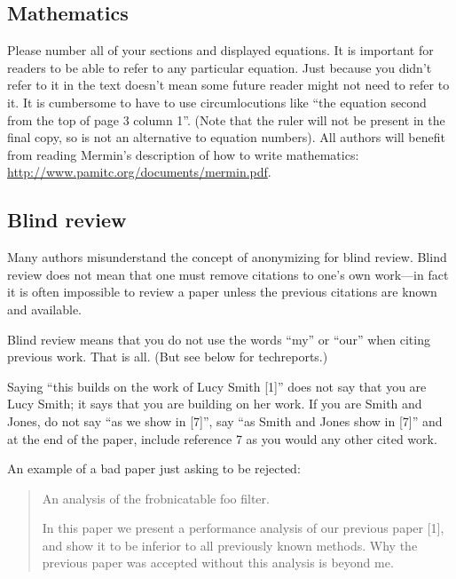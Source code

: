 \documentclass[10pt,twocolumn,letterpaper]{article}
\begin{document}
\begin{CJK}{UTF8}{bkai}
   \subsection{Mathematics}

   Please number all of your sections and displayed equations.  It is
   important for readers to be able to refer to any particular equation.  Just
   because you didn't refer to it in the text doesn't mean some future reader
   might not need to refer to it.  It is cumbersome to have to use
   circumlocutions like ``the equation second from the top of page 3 column
   1''.  (Note that the ruler will not be present in the final copy, so is not
   an alternative to equation numbers).  All authors will benefit from reading
   Mermin's description of how to write mathematics:
   \url{http://www.pamitc.org/documents/mermin.pdf}.


   \subsection{Blind review}

   Many authors misunderstand the concept of anonymizing for blind
   review.  Blind review does not mean that one must remove
   citations to one's own work---in fact it is often impossible to
   review a paper unless the previous citations are known and
   available.

   Blind review means that you do not use the words ``my'' or ``our''
   when citing previous work.  That is all.  (But see below for
   techreports.)

   Saying ``this builds on the work of Lucy Smith [1]'' does not say
   that you are Lucy Smith; it says that you are building on her
   work.  If you are Smith and Jones, do not say ``as we show in
      [7]'', say ``as Smith and Jones show in [7]'' and at the end of the
   paper, include reference 7 as you would any other cited work.

   An example of a bad paper just asking to be rejected:
   \begin{quote}
      \begin{center}
         An analysis of the frobnicatable foo filter.
      \end{center}

      In this paper we present a performance analysis of our
      previous paper [1], and show it to be inferior to all
      previously known methods.  Why the previous paper was
      accepted without this analysis is beyond me.


\end{quote}
\end{CJK}
\end{document}
